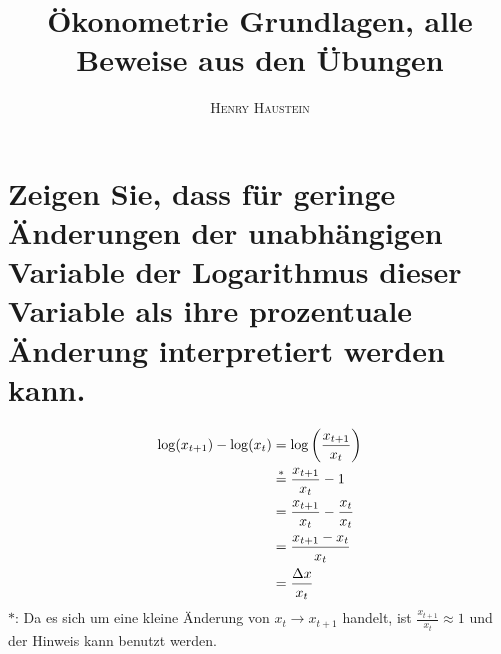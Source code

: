 \documentclass{article}
\title{\textbf{Ökonometrie Grundlagen, alle Beweise aus den Übungen}}
\author{\textsc{Henry Haustein}}
\date{}
\begin{document}
	\maketitle
	
	\tableofcontents
	
	\section{Zeigen Sie, dass für geringe Änderungen der unabhängigen Variable der Logarithmus dieser Variable als ihre prozentuale Änderung interpretiert werden kann.}
	\begin{align}
		\log(x_{t+1}) - \log(x_t) &= \log\left(\frac{x_{t+1}}{x_t}\right) \notag \\
		&\overset{\ast}{=} \frac{x_{t+1}}{x_t} - 1 \notag \\
		&= \frac{x_{t+1}}{x_t} - \frac{x_t}{x_t} \notag \\
		&= \frac{x_{t+1}-x_t}{x_t} \notag \\
		&= \frac{\Delta x}{x_t} \notag
	\end{align}
	$\ast$: Da es sich um eine kleine Änderung von $x_t\to x_{t+1}$ handelt, ist $ \frac{x_{t+1}}{x_t}\approx 1$ und der Hinweis kann benutzt werden.
	
\end{document}
